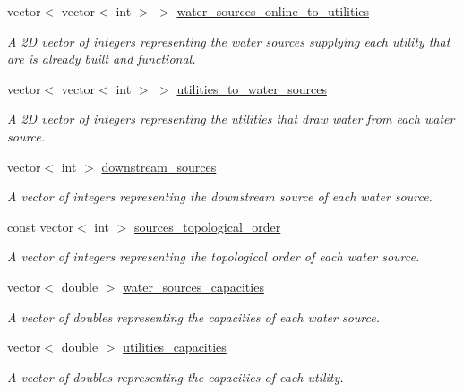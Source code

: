 \begin{DoxyCompactItemize}
vector$<$ vector$<$ int $>$ $>$ \mbox{\hyperlink{classContinuityModel_a6d80a7e50e022e2cdb5e912d5b3b5cf0}{water\+\_\+sources\+\_\+online\+\_\+to\+\_\+utilities}}
\begin{DoxyCompactList}\small\item\em A 2D vector of integers representing the water sources supplying each utility that are is already built and functional. \end{DoxyCompactList}\item 
vector$<$ vector$<$ int $>$ $>$ \mbox{\hyperlink{classContinuityModel_a5cf4be0afa886eb09a3e143f54c29044}{utilities\+\_\+to\+\_\+water\+\_\+sources}}
\begin{DoxyCompactList}\small\item\em A 2D vector of integers representing the utilities that draw water from each water source. \end{DoxyCompactList}\item 
vector$<$ int $>$ \mbox{\hyperlink{classContinuityModel_af00ea62ac8e2e398591ff608c2a203ef}{downstream\+\_\+sources}}
\begin{DoxyCompactList}\small\item\em A vector of integers representing the downstream source of each water source. \end{DoxyCompactList}\item 
const vector$<$ int $>$ \mbox{\hyperlink{classContinuityModel_a6605cb6aae0370eb84d2e8bf7d6d651e}{sources\+\_\+topological\+\_\+order}}
\begin{DoxyCompactList}\small\item\em A vector of integers representing the topological order of each water source. \end{DoxyCompactList}\item 
vector$<$ double $>$ \mbox{\hyperlink{classContinuityModel_aadc8d46b2d0cc0a5c6b5ccdf0c5c24d4}{water\+\_\+sources\+\_\+capacities}}
\begin{DoxyCompactList}\small\item\em A vector of doubles representing the capacities of each water source. \end{DoxyCompactList}\item 
vector$<$ double $>$ \mbox{\hyperlink{classContinuityModel_a781786effdf14fefcb2201eb33d9e0c7}{utilities\+\_\+capacities}}
\begin{DoxyCompactList}\small\item\em A vector of doubles representing the capacities of each utility. \end{DoxyCompactList}\item 

\end{DoxyCompactItemize}
